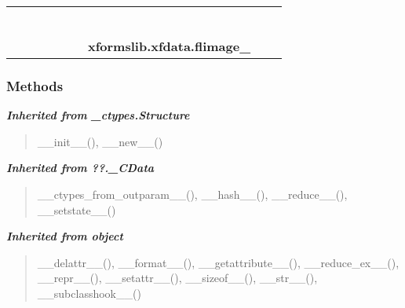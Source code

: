     \label{xformslib:xfdata:flimage_}
\begin{tabular}{cccccccccc}
\multicolumn{2}{r}{\settowidth{\BCL}{object}\multirow{2}{\BCL}{object}}
&&
&&
&&
  \\\cline{3-3}
  &&\multicolumn{1}{c|}{}
&&
&&
&&
  \\
\multicolumn{4}{r}{\settowidth{\BCL}{??.\_CData}\multirow{2}{\BCL}{??.\_CData}}
&&
&&
  \\\cline{5-5}
  &&&&\multicolumn{1}{c|}{}
&&
&&
  \\
\multicolumn{6}{r}{\settowidth{\BCL}{\_ctypes.Structure}\multirow{2}{\BCL}{\_ctypes.Structure}}
&&
  \\\cline{7-7}
  &&&&&&\multicolumn{1}{c|}{}
&&
  \\
&&&&&&\multicolumn{2}{l}{\textbf{xformslib.xfdata.flimage\_}}
\end{tabular}



  \subsubsection{Methods}


\large{\textbf{\textit{Inherited from \_ctypes.Structure}}}

\begin{quote}
\_\_init\_\_(), \_\_new\_\_()
\end{quote}

\large{\textbf{\textit{Inherited from ??.\_CData}}}

\begin{quote}
\_\_ctypes\_from\_outparam\_\_(), \_\_hash\_\_(), \_\_reduce\_\_(), \_\_setstate\_\_()
\end{quote}

\large{\textbf{\textit{Inherited from object}}}

\begin{quote}
\_\_delattr\_\_(), \_\_format\_\_(), \_\_getattribute\_\_(), \_\_reduce\_ex\_\_(), \_\_repr\_\_(), \_\_setattr\_\_(), \_\_sizeof\_\_(), \_\_str\_\_(), \_\_subclasshook\_\_()
\end{quote}


